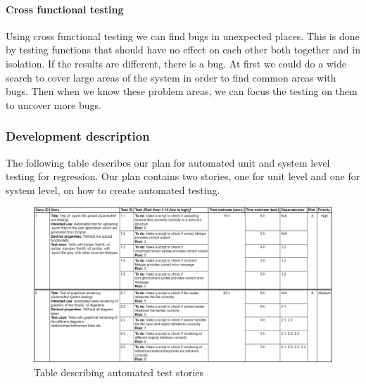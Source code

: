 \documentclass{article}
\begin{document}
\paragraph{Cross functional testing}
Using cross functional testing we can find bugs in unexpected places. This is done by testing functions that should have no effect on each other both together and in isolation. If the results are different, there is a bug. At first we could do a wide search to cover large areas of the system in order to find common areas with bugs. Then when we know these problem areas, we can focus the testing on them to uncover more bugs. 


\subsubsection{Development description}

The following table describes our plan for automated unit and system level testing for regression. Our plan contains two stories, one for unit level and one for system level, on how to create automated testing.

\begin{figure}[H]
    \begin{center}
        \includegraphics[width=1\textwidth]{Test-table.png}
        \caption{Table describing automated test stories}
        \label{package}
    \end{center}
\end{figure}


\printbibliography
\end{document}
